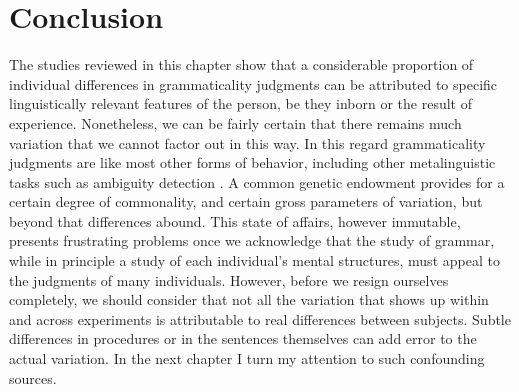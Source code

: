 \section{Conclusion} \label{sec:4.5}

The studies reviewed in this chapter show that a considerable proportion of individual differences in grammaticality judgments can be attributed to specific linguistically relevant features of the person, be they inborn or the result of experience. Nonetheless, we can be fairly certain that there remains much variation that we cannot factor out in this way. In this regard grammaticality judgments are like most other forms of behavior, including other metalinguistic tasks such as ambiguity detection \citep{KessEtAl1983}. A common genetic endowment provides for a certain degree of commonality, and certain gross parameters of variation, but beyond  that differences abound. This state of affairs, however immutable, presents frustrating problems once we acknowledge that the study of grammar, while in principle a study of each individual's mental structures, must appeal to the judgments of many individuals. However, before we resign ourselves completely, we should consider that not all the variation that shows up within and across experiments is attributable to real differences between subjects. Subtle differences in procedures or in the sentences themselves can add error to the actual variation. In the next chapter I turn my attention to such confounding sources.